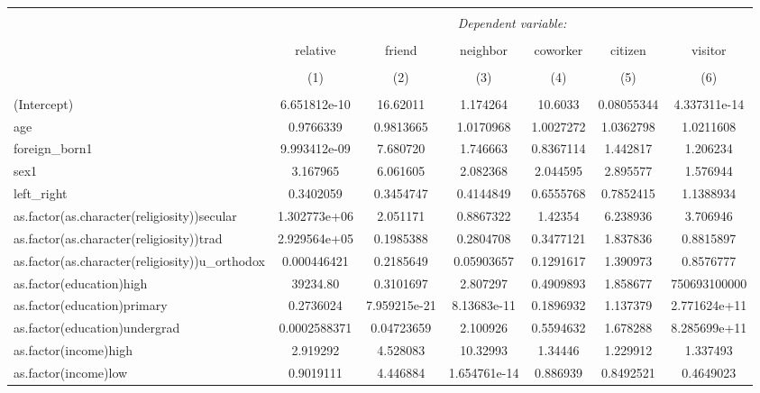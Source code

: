 \documentclass[12pt,letterpaper]{article}
\begin{document}
\begin{table}[!htbp]
	\centering 
	\caption{} 
	\label{} 
	\begin{adjustbox}{max width=\textwidth}
		\begin{tabular}{@{\extracolsep{5pt}}lcccccc} 
			\hline 
			\hline \\[-1.8ex] 
			& \multicolumn{6}{c}{\textit{Dependent variable:}} \\ 
			\cline{2-7} 
			\\[-1.8ex] & relative & friend & neighbor & coworker & citizen & visitor \\ 
			\\[-1.8ex] & (1) & (2) & (3) & (4) & (5) & (6)\\ 
			\hline \\[-1.8ex] 
			(Intercept) & 6.651812e-10 & 16.62011 & 1.174264 & 10.6033 & 0.08055344 & 4.337311e-14 \\
			age & 0.9766339 & 0.9813665 & 1.0170968 & 1.0027272 & 1.0362798 & 1.0211608 \\
			foreign\_born1 & 9.993412e-09 & 7.680720 & 1.746663 & 0.8367114 & 1.442817 & 1.206234 \\
			sex1 & 3.167965 & 6.061605 & 2.082368 & 2.044595 & 2.895577 & 1.576944 \\
			left\_right & 0.3402059 & 0.3454747 & 0.4144849 & 0.6555768 & 0.7852415 & 1.1388934 \\
			as.factor(as.character(religiosity))secular & 1.302773e+06 & 2.051171 & 0.8867322 & 1.42354 & 6.238936 & 3.706946 \\
			as.factor(as.character(religiosity))trad & 2.929564e+05 & 0.1985388 & 0.2804708 & 0.3477121 & 1.837836 & 0.8815897 \\
			as.factor(as.character(religiosity))u\_orthodox & 0.000446421 & 0.2185649 & 0.05903657 & 0.1291617 & 1.390973 & 0.8576777 \\
			as.factor(education)high & 39234.80 & 0.3101697 & 2.807297 & 0.4909893 & 1.858677 & 750693100000 \\
			as.factor(education)primary & 0.2736024 & 7.959215e-21 & 8.13683e-11 & 0.1896932 & 1.137379 & 2.771624e+11 \\
			as.factor(education)undergrad & 0.0002588371 & 0.04723659 & 2.100926 & 0.5594632 & 1.678288 & 8.285699e+11 \\
			as.factor(income)high & 2.919292 & 4.528083 & 10.32993 & 1.34446 & 1.229912 & 1.337493 \\
			as.factor(income)low & 0.9019111 & 4.446884 & 1.654761e-14 & 0.886939 & 0.8492521 & 0.4649023 \\

\end{tabular}
\end{adjustbox}
\end{table}
\end{document}
